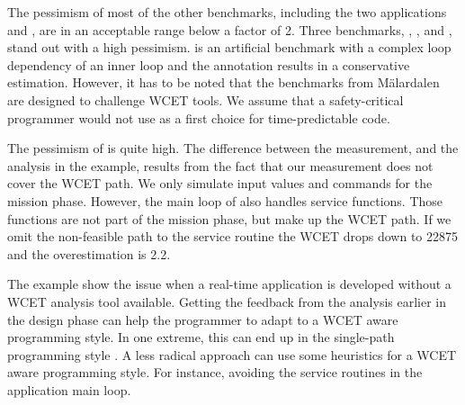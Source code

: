 The pessimism of most of the other benchmarks, including the two
applications  and , are in an acceptable
range below a factor of 2. Three benchmarks, ,
, and , stand out with a high pessimism.
 is an artificial benchmark with a complex loop
dependency of an inner loop and the annotation results in a
conservative estimation. However, it has to be noted that the
benchmarks from M\"alardalen are designed to challenge WCET tools. We
assume that a safety-critical programmer would not use
 as a first choice for time-predictable code.


The pessimism of  is quite high. The difference between the
measurement, and the analysis in the  example, results from
the fact that our measurement does not cover the WCET path. We only
simulate input values and commands for the mission phase. However,
the main loop of  also handles service functions. Those
functions are not part of the mission phase, but make up the WCET
path. If we omit the non-feasible path to the service routine the
WCET drops down to 22875 and the overestimation is 2.2.





The  example show the issue when a real-time application is
developed without a WCET analysis tool available. Getting the
feedback from the analysis earlier in the design phase can help the
programmer to adapt to a WCET aware programming style. In one
extreme, this can end up in the single-path programming style
\cite{pusch02:single:path}. A less radical approach can use some
heuristics for a WCET aware programming style. For instance, avoiding
the service routines in the application main loop.

